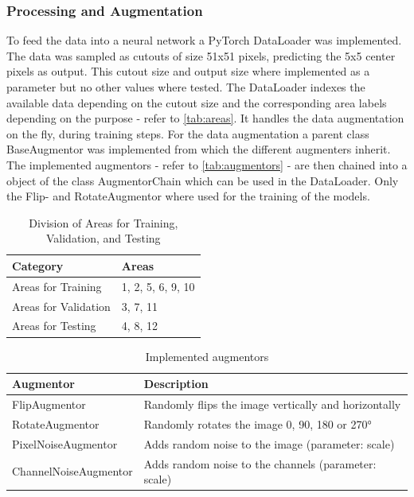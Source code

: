\subsubsection{Processing and Augmentation}%

To feed the data into a neural network a PyTorch DataLoader was implemented.
The data was sampled as cutouts of size 51x51 pixels, predicting the 5x5 center pixels as output.
This cutout size and output size where implemented as a parameter 
but no other values where tested.
The DataLoader indexes the available data depending on the cutout size and the 
corresponding area labels depending on the purpose - refer to \autoref{tab:areas}. 
It handles the data augmentation on the fly, during training steps.
For the data augmentation a parent class BaseAugmentor was implemented from which the different augmenters inherit. 
The implemented augmentors - refer to \autoref{tab:augmentors} - are then chained into a object of the class AugmentorChain
which can be used in the DataLoader. Only the Flip- and RotateAugmentor where used for the training of the models.

\begin{table}[h!]
    \centering
    \caption{Division of Areas for Training, Validation, and Testing}
    \label{tab:areas}
        \begin{tabular}{ll}
        \toprule
        \textbf{Category}          & \textbf{Areas}       \\ 
        \midrule
        Areas for Training         & 1, 2, 5, 6, 9, 10   \\
        Areas for Validation       & 3, 7, 11            \\
        Areas for Testing          & 4, 8, 12            \\ 
        \bottomrule
        \end{tabular}
\end{table}

\begin{table}[H]
    \centering
    \caption{Implemented augmentors}
    \label{tab:augmentors}
        \begin{tabular}{ll}
        \toprule
        \textbf{Augmentor} & \textbf{Description} \\
        \midrule
        FlipAugmentor & Randomly flips the image vertically and horizontally\\
        RotateAugmentor & Randomly rotates the image 0, 90, 180 or 270° \\
        PixelNoiseAugmentor & Adds random noise to the image (parameter: scale) \\
        ChannelNoiseAugmentor & Adds random noise to the channels (parameter: scale) \\
        \bottomrule
        \end{tabular}
\end{table}


